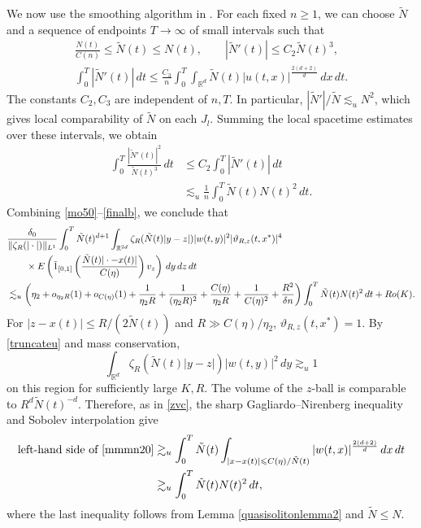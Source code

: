 \documentclass[reqno,11pt]{amsart}
\theoremstyle{plain}
\theoremstyle{definition}
\numberwithin{equation}{section}
\numberwithin{theorem}{section}
\def\geq{\geqslant}
\def\leq{\leqslant}
\def\R{\mathbb{R}}
\begin{document}
We now use the smoothing algorithm in \cite[Section 4]{Dodson-Adv}.
For each fixed $n\geq1$, we can choose $\tilde N$ and a sequence of endpoints
$T\to\infty$ of small intervals such that
\begin{gather*}
 \frac{N(t)}{C(n)}\leq\tilde N(t)\leq N(t),\qquad
 |\tilde N'(t)|\leq C_2\tilde N(t)^3,\\
 \int_0^T|\tilde N'(t)|\,dt
 \leq\frac{C_3}{n}\int_0^T\int_{\R^d}
          \tilde N(t)|u(t,x)|^{\frac{2(d+2)}d}\,dx\,dt.
\end{gather*}
The constants $C_2,C_3$ are independent of $n,T$. In particular,
$|\tilde N'|/\tilde N\lesssim_u N^2$, which gives local comparability
of $\tilde N$ on each $J_l$. Summing the local spacetime estimates over
these intervals, we obtain
\begin{align*}
 \int_0^T\frac{|\tilde N'(t)|^2}{\tilde N(t)^3}\,dt
 &\leq C_2\int_0^T|\tilde N'(t)|\,dt\\
 &\lesssim_u\frac1n\int_0^T\tilde N(t)N(t)^2\,dt.
\end{align*}
Combining \eqref{mo50}--\eqref{finalb}, we conclude that
\begin{align}\label{mmmn20}
 &\frac{\delta_0}{\|\zeta_R(|\cdot|)\|_{L^1}}
       \int_0^T\tilde N(t)^{d+1}\int_{\R^{2d}}
       \zeta_R(\tilde N(t)|y-z|)|w(t,y)|^2
       |\vartheta_{R,z}(t,x^{\ast})|^4\notag\\
 &\qquad\times E\left(\tilde{1}_{[0,1]}
       \left(\frac{\tilde N(t)|\cdot-x(t)|}{C(\eta)}\right)v_z\right)
                 \,dy\,dz\,dt\notag\\
 &\lesssim_u\left(\eta_2+o_{\eta_2R}(1)+o_{C(\eta)}(1)
       +\frac1{\eta_2R}+\frac1{(\eta_2R)^2}
       +\frac{C(\eta)}{\eta_2R}+\frac1{C(\eta)^2}
       +\frac{R^2}{\delta n}\right)
       \int_0^T\tilde N(t)N(t)^2\,dt+Ro(K).
\end{align}
For $|z-x(t)|\leq R/(2\tilde N(t))$ and $R\gg C(\eta)/\eta_2$,
$\vartheta_{R,z}(t,x^{\ast})=1$. By \eqref{truncateu} and mass conservation,
\[
 \int_{\R^d}\zeta_R(\tilde N(t)|y-z|)|w(t,y)|^2\,dy\gtrsim_u1
\]
on this region for sufficiently large $K,R$. The volume of the $z$-ball
is comparable to $R^d\tilde N(t)^{-d}$. Therefore, as in \eqref{zvc}, the
sharp Gagliardo--Nirenberg inequality and Sobolev interpolation give
\begin{align}\label{finalm}
 \text{left-hand side of }\eqref{mmmn20}
 &\gtrsim_u\int_0^T\tilde N(t)
       \int_{|x-x(t)|\leq C(\eta)/\tilde N(t)}
       |w(t,x)|^{\frac{2(d+2)}d}\,dx\,dt\notag\\
 &\gtrsim_u\int_0^T\tilde N(t)N(t)^2\,dt,
\end{align}
where the last inequality follows from Lemma \ref{quasisolitonlemma2}
and $\tilde N\leq N$.
\end{document}
